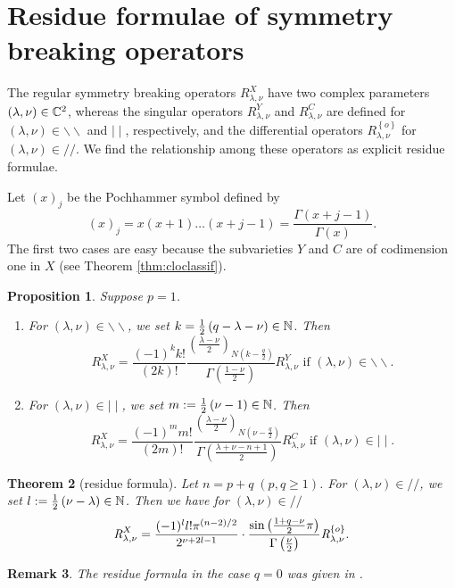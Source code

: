 \documentclass[reqno,12pt]{pja00} %
\newtheorem{theorem}{Theorem}[section]
\newtheorem{remark}[theorem]{Remark}
\newtheorem{proposition}[theorem]{Proposition}
\theoremstyle{definition}
\theoremstyle{exampstyle} \newtheorem{examp}[theorem]{Theorem}
\newcommand{\OpR}{\mbox{\it R}}
\begin{document}
\section{Residue formulae of symmetry breaking operators}
The regular symmetry breaking operators $R_{\lambda,\nu}^X$ have two complex parameters $(\lambda,\nu)\in\mathbb{C}^2$, whereas the singular operators $R_{\lambda,\nu}^Y$ and $R_{\lambda,\nu}^C$ are defined
for $(\lambda,\nu)\in\backslash\backslash$ and $\mid\mid$, respectively, and the differential operators $R_{\lambda,\nu}^{ \left\{ o \right\}}$ for $(\lambda,\nu)\in//$. We find the relationship
among these operators as explicit residue formulae. 

Let $\left( x \right)_j$ be the Pochhammer symbol defined by\begin{equation*}
	\left( x \right)_j=x(x+1)\dots(x+j-1)=\frac{\Gamma(x+j-1)}{\Gamma(x)}.
\end{equation*}
The first two cases are easy because the subvarieties $Y$ and $C$ are of codimension one in $X$ (see Theorem \ref{thm:cloclassif}).
\begin{proposition}
	Suppose $p=1$.\begin{enumerate}[(1)]
		\item For $(\lambda,\nu)\in\backslash\backslash$, we set $k=\frac{1}{2}\left( q-\lambda-\nu \right)\in\mathbb{N}$. Then
\begin{equation*}
R_{\lambda,\nu}^X=\frac{(-1)^kk!}{(2k)!}\frac{\left( \frac{\lambda-\nu}{2} \right)_{N\left(k-\frac{q}{2}  \right)}}{\Gamma\left( \frac{1-\nu}{2}\right) }R_{\lambda,\nu}^Y\mbox{ if }(\lambda,\nu)\in\backslash\backslash.
\end{equation*}
\item For $(\lambda,\nu)\in\mid\mid$, we set $m:=\frac{1}{2}\left( \nu-1 \right)\in\mathbb{N}$. Then
\begin{equation*}
R_{\lambda,\nu}^X=\frac{(-1)^mm!}{(2m)!}\frac{\left( \frac{\lambda-\nu}{2} \right)_{N\left( \nu-\frac{q}{2} \right)}}{\Gamma\left( \frac{\lambda+\nu-n+1}{2}\right)}R_{\lambda,\nu}^C\mbox{ if }(\lambda,\nu)\in\mid\mid.
\end{equation*}
	\end{enumerate}
\end{proposition}
\begin{theorem}[residue formula]
	Let $n=p+q\;(p,q\ge1)$.
	For $(\lambda,\nu)\in//$, we set $l:=\frac{1}{2}\left( \nu-\lambda \right)\in\mathbb{N}$. Then we have for $(\lambda,\nu)\in//$
  \[\OpR_{\lambda,\nu}^X  = \frac{ (- 1)^l l!\pi^{(n - 2) / 2} 
		}{2^{ \nu + 2 l-1}}\cdot  \frac{\sin\left( \frac{1+q-\nu}{2}\pi \right)}{\Gamma\left( \frac{\nu}{2} \right)}
	\OpR_{\lambda,\nu}^{ \left\{ o \right\} }. \]
	\end{theorem}
	\begin{remark}
		The residue formula in the case $q=0$ was given in \cite[Thm.\ 12.2]{kobayashi2015symmetry}.
	\end{remark}
\end{document}
